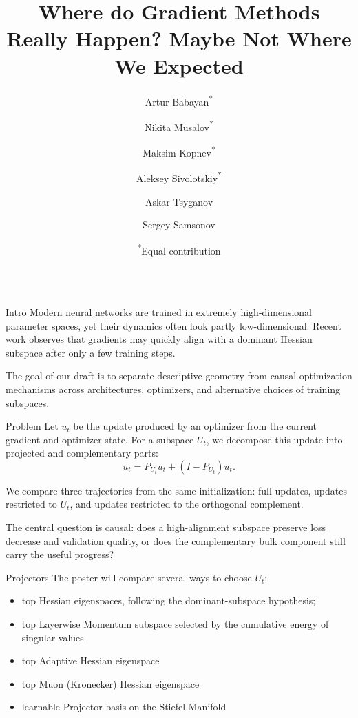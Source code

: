 \documentclass[final]{beamer}
\title{Where do Gradient Methods Really Happen? Maybe Not Where We Expected}
\author{Artur Babayan\texorpdfstring{\textsuperscript{*}}{*} \and Nikita Musalov\texorpdfstring{\textsuperscript{*}}{*} \and Maksim Kopnev\texorpdfstring{\textsuperscript{*}}{*} \and Aleksey Sivolotskiy\texorpdfstring{\textsuperscript{*}}{*}\and Askar Tsyganov\and Sergey Samsonov}
\institute{HSE University, Moscow, Russia}
\date{\textsuperscript{*}Equal contribution}
\begin{document}
\begin{frame}[t]
\posterheader

\begin{columns}[T,totalwidth=\textwidth]
  \begin{postercol}
    \begin{posterblock}{Intro}
      Modern neural networks are trained in extremely high-dimensional parameter spaces, yet their dynamics often look partly low-dimensional. Recent work observes that gradients may quickly align with a dominant Hessian subspace after only a few training steps.

      The goal of our draft is to separate descriptive geometry from causal optimization mechanisms across architectures, optimizers, and alternative choices of training subspaces.
    \end{posterblock}

    \vspace{2.55cm}

    \begin{posterblock}{Problem}
      Let \(u_t\) be the update produced by an optimizer from the current gradient and optimizer state. For a subspace \(U_t\), we decompose this update into projected and complementary parts:
      \[
        u_t=P_{U_t}u_t+(I-P_{U_t})u_t .
      \]

      We compare three trajectories from the same initialization: full updates, updates restricted to \(U_t\), and updates restricted to the orthogonal complement.

      The central question is causal: does a high-alignment subspace preserve loss decrease and validation quality, or does the complementary bulk component still carry the useful progress?
    \end{posterblock}

    \vspace{2.55cm}

    \begin{posterblock}{Projectors}
      The poster will compare several ways to choose \(U_t\):
      \begin{itemize}
        \item top Hessian eigenspaces, following the dominant-subspace hypothesis;
        \item top Layerwise Momentum subspace  selected by the cumulative energy of singular values
        \item top Adaptive Hessian eigenspace
        \item top Muon (Kronecker) Hessian eigenspace
        \item learnable Projector basis on the Stiefel Manifold
      \end{itemize}
    \end{posterblock}


\end{postercol}
\end{columns}
\end{frame}
\end{document}
